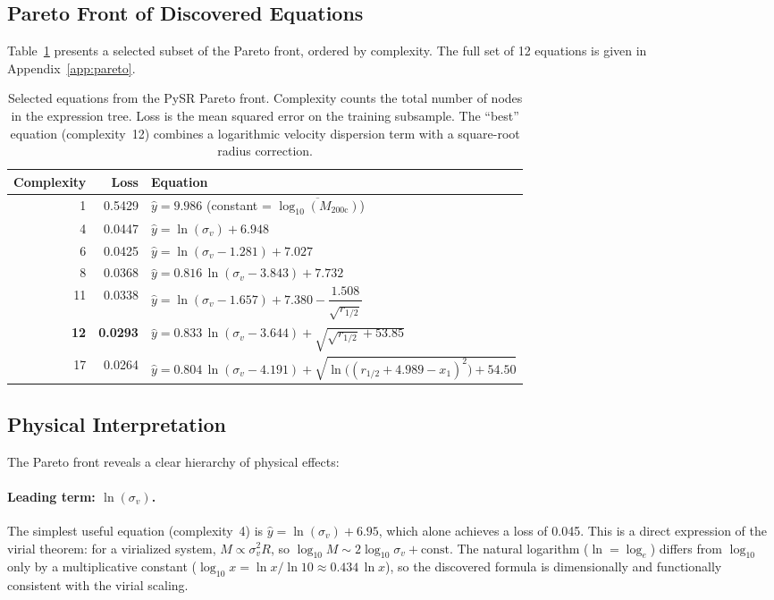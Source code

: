 \documentclass[12pt, a4paper]{article}
\newcommand{\logMhalo}{\log_{10}(M_{200\mathrm{c}})}
\newcommand{\sigmav}{\sigma_v}
\begin{document}
\subsection{Pareto Front of Discovered Equations}
\label{sec:pareto}

Table~\ref{tab:pareto} presents a selected subset of the Pareto front, ordered by complexity.  The full set of 12 equations is given in Appendix~\ref{app:pareto}.

\begin{table}[H]
  \centering
  \caption{Selected equations from the PySR Pareto front.  Complexity counts the total number of nodes in the expression tree.  Loss is the mean squared error on the training subsample.  The ``best'' equation (complexity~12) combines a logarithmic velocity dispersion term with a square-root radius correction.}
  \label{tab:pareto}
  \begin{tabular}{@{}rrl@{}}
    \toprule
    Complexity & Loss & Equation \\
    \midrule
    1  & 0.5429 & $\hat{y} = 9.986$ \quad (constant = $\overline{\logMhalo}$) \\[3pt]
    4  & 0.0447 & $\hat{y} = \ln(\sigmav) + 6.948$ \\[3pt]
    6  & 0.0425 & $\hat{y} = \ln(\sigmav - 1.281) + 7.027$ \\[3pt]
    8  & 0.0368 & $\hat{y} = 0.816\,\ln(\sigmav - 3.843) + 7.732$ \\[3pt]
    11 & 0.0338 & $\hat{y} = \ln(\sigmav - 1.657) + 7.380 - \dfrac{1.508}{\sqrt{r_{1/2}}}$ \\[6pt]
    \textbf{12} & \textbf{0.0293} & $\hat{y} = 0.833\,\ln(\sigmav - 3.644) + \sqrt{\sqrt{r_{1/2}} + 53.85}$ \\[3pt]
    17 & 0.0264 & $\hat{y} = 0.804\,\ln(\sigmav - 4.191) + \sqrt{\ln\bigl((r_{1/2} + 4.989 - x_1)^2\bigr) + 54.50}$ \\
    \bottomrule
  \end{tabular}
\end{table}


\subsection{Physical Interpretation}
\label{sec:pysr_interp}

The Pareto front reveals a clear hierarchy of physical effects:

\paragraph{Leading term: $\ln(\sigmav)$.}
The simplest useful equation (complexity~4) is $\hat{y} = \ln(\sigmav) + 6.95$, which alone achieves a loss of 0.045.  This is a direct expression of the virial theorem: for a virialized system, $M \propto \sigmav^2 R$, so $\log_{10} M \sim 2\log_{10}\sigmav + \text{const}$.  The natural logarithm ($\ln = \log_e$) differs from $\log_{10}$ only by a multiplicative constant ($\log_{10} x = \ln x / \ln 10 \approx 0.434\,\ln x$), so the discovered formula is dimensionally and functionally consistent with the virial scaling.
\end{document}
